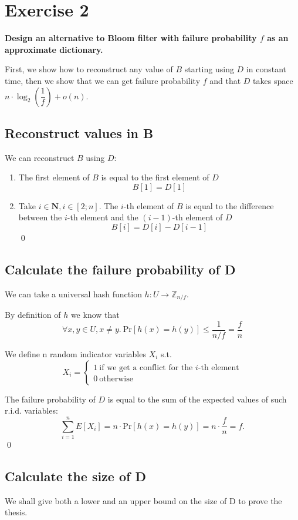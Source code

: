 \documentclass{article}
\begin{document}
\section{Exercise 2}
\textbf{Design an alternative to Bloom filter with failure probability \(f\) as an approximate dictionary.}

First, we show how to reconstruct any value of \(B\) starting using \(D\) in constant time,
then we show that we can get failure probability \(f\) and that \(D\) takes space
\(n \cdot \log_2\left(\dfrac{1}{f}\right) + o(n)\).

\subsection{Reconstruct values in B}
We can reconstruct \(B\) using \(D\):
\begin{enumerate}
	\item The first element of \(B\) is equal to the first element of \(D\) \[B[1] = D[1]\]
	\item Take \(i \in \mathbf{N}, i \in \left[ 2; n \right]\). The \(i\)-th element of \(B\) is equal to the
	difference between the \(i\)-th element and the \((i-1)\)-th element of \(D\) \[B[i] = D[i] - D[i-1] \]\qed
\end{enumerate}

\subsection{Calculate the failure probability of D}
We can take a universal hash function \(h: U \rightarrow \mathbb{Z}_{n/f}\).

By definition of \(h\) we know that
\[\forall x, y \in U, x \neq y. \ \mathrm{Pr}\left[h(x) = h(y)\right] \leq \dfrac{1}{n/f} = \dfrac{f}{n}\]

We define n random indicator variables \(X_i\) s.t.
\[
	X_i =
	\left\{
		\begin{array}{l}
			1 \ \text{if we get a conflict for the \(i\)-th element} \\
			0 \ \text{otherwise}
		\end{array}
	\right.
\]

The failure probability of \(D\) is equal to the sum of the expected values of such r.i.d. variables:
\[
	\sum_{i=1}^n E[X_i] = n \cdot \mathrm{Pr}\left[h(x) = h(y)\right] = n \cdot \dfrac{f}{n} = f.
\] \qed

\subsection{Calculate the size of D}
We shall give both a lower and an upper bound on the size of D to prove the thesis.
\end{document}
